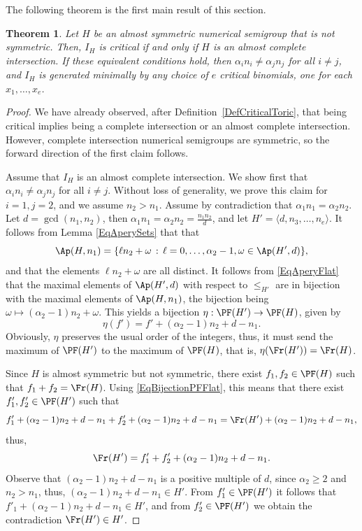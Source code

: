 \documentclass[11pt,twoside]{amsart}
\newtheorem{thm}[Theorem]{Theorem}
\theoremstyle{definition}
\numberwithin{equation}{section}
\begin{document}
The following theorem is the first main result of this section.

\begin{thm}\label{ThmCriticalIffAci}
Let $H$ be an almost symmetric numerical semigroup that is not symmetric.
Then,  $I_H$ is critical  if and only if $H$ is an almost  complete intersection.
If these equivalent conditions hold, then $\alpha_i n_i \ne \alpha_j n_j$ for all $i\ne j$, and $I_H$ is generated minimally by any choice of $e$ critical binomials, one for each $x_1, \ldots, x_e$.
\end{thm}
\begin{proof}	
We have already  observed, after Definition~\ref{DefCriticalToric}, that being critical implies being a complete intersection or an  almost complete intersection.
However, complete intersection numerical semigroups are symmetric,  
so the forward direction of the first claim follows.

Assume that $I_H$ is an almost complete intersection.
We show first that  $\alpha_i n_i \ne \alpha_j n_j$ for all $i\ne j$. 
Without loss of generality, we prove this claim for $i=1, j=2$, and we assume $n_2 > n_1$.
Assume by contradiction that $\alpha_1 n_1 = \alpha_2 n_2$. 
Let $d=\gcd(n_1,n_2)$, then $\alpha_1n_1=\alpha_2n_2=\frac{n_1n_2}{d}$, and
let $H'= \langle d, n_3, \dots, n_e \rangle$.
It follows from Lemma \ref{EqAperySets} that
that 
\begin{equation}\label{EqAperyFlat}
    \Ap(H, n_1)=\{\ell n_2 +\omega \,: \, \ell = 0, \ldots, \alpha_2-1, \omega \in \Ap(H', d)\},
\end{equation}
and that the elements $\ell n_2 +\omega$  are all distinct.
It follows from \eqref{EqAperyFlat} that the maximal elements of $\Ap(H',d)$ with respect to $\leq_{H'}$ are in bijection with the maximal elements of $\Ap(H,n_1)$, the bijection being $\omega \mapsto (\alpha_2-1)n_2+\omega$.
This yields a bijection  $\eta: \PF(H')\to \PF(H)$,
given by 
\begin{equation}\label{EqBijectionPFFlat}
\eta(f')= f' + (\alpha_2-1)n_2 +d-n_1.
    \end{equation}
Obviously, $\eta$ preserves the usual order of the integers, thus, it must send the maximum of $\PF(H')$ to the maximum of $\PF(H)$,
that is, $\eta(\Fr(H'))=\Fr(H)$.

Since $H$ is almost symmetric but not symmetric,  there exist $f_1, f_2 \in \PF(H)$ such that $f_1+f_2 = \Fr(H) $.
Using \eqref{EqBijectionPFFlat}, this means that there exist $f'_1, f'_2 \in \PF(H')$
such that 
$$
f'_1+ (\alpha_2-1)n_2 +d-n_1 + f'_2+ (\alpha_2-1)n_2 +d-n_1 = \Fr(H')+(\alpha_2-1)n_2 +d-n_1,
$$
thus,
$$
\Fr(H')=f'_1 + f'_2+ (\alpha_2-1)n_2 +d-n_1 .
$$
Observe that $(\alpha_2-1)n_2 +d-n_1$ is a positive multiple of $d$, since $ \alpha_2 \geq 2$ and $n_2>n_1$, thus, $(\alpha_2-1)n_2 +d-n_1\in H'$.
From $f'_1 \in \PF(H')$ it follows that $f'_1 +  (\alpha_2-1)n_2 +d-n_1 \in H'$, and from $f'_2 \in \PF(H')$ we obtain the contradiction $\Fr(H') \in H'$.


\end{proof}
\end{document}
